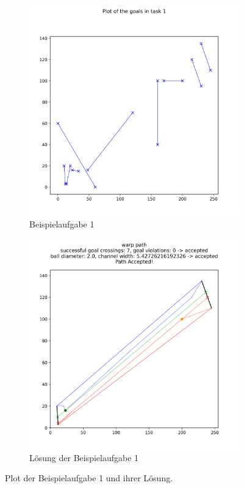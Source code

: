 \begin{figure}[h]
\label{fig:beispiele}
     \centering
     \begin{subfigure}[b]{0.49\textwidth}
         \centering
         \includegraphics[width=\textwidth]{images/task_1.jpeg}
         \caption{Beispielaufgabe 1}
         \label{fig:y equals x}
     \end{subfigure}
     \hfill
     \begin{subfigure}[b]{0.49\textwidth}
         \centering
         \includegraphics[width=\textwidth]{images/solution_task_1.png}
         \caption{Lösung der Beispielaufgabe 1}
         \label{fig:three sin x}
     \end{subfigure}
     \caption{Plot der Beispielaufgabe 1 und ihrer Lösung.}
        \label{fig:three graphs}
\end{figure}

